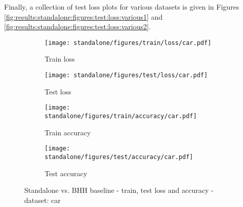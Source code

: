 Finally, a collection of test loss plots for various datasets is given in Figures \ref{fig:results:standalone:figures:test:loss:various1} and \ref{fig:results:standalone:figures:test:loss:various2}.

\begin{figure}[htbp]
      \begin{subfigure}{0.5\textwidth}
            \centering
            \texttt{[image: standalone/figures/train/loss/car.pdf]}
            \caption{Train loss}
            \label{fig:results:standalone:figures:loss:train:car}
      \end{subfigure}
      \begin{subfigure}{0.5\textwidth}
            \centering
            \texttt{[image: standalone/figures/test/loss/car.pdf]}
            \caption{Test loss}
            \label{fig:results:standalone:figures:loss:test:car}
      \end{subfigure}
      \par\bigskip
      \begin{subfigure}{0.5\textwidth}
            \centering
            \texttt{[image: standalone/figures/train/accuracy/car.pdf]}
            \caption{Train accuracy}
            \label{fig:results:standalone:figures:accuracy:train:car}
      \end{subfigure}
      \begin{subfigure}{0.5\textwidth}
            \centering
            \texttt{[image: standalone/figures/test/accuracy/car.pdf]}
            \caption{Test accuracy}
            \label{fig:results:standalone:figures:accuracy:test:car}
      \end{subfigure}
      \par\bigskip
      \caption{Standalone vs. \Acs{BHH} baseline - train, test loss and accuracy - dataset: car}
      \label{fig:results:standalone:figures:car}
\end{figure}

